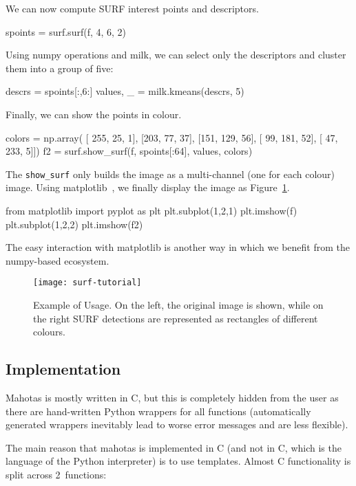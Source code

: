 \documentclass{scrartcl}
\newcommand*{\cpp}{{C\nolinebreak[4]\hspace{-.05em}\raisebox{.4ex}{\tiny\textbf{++}}}}
\begin{document}
We can now compute SURF interest points and descriptors.
\begin{python}
spoints = surf.surf(f, 4, 6, 2)
\end{python}

Using numpy operations and milk, we can select only the descriptors and cluster
them into a group of five:

\begin{python}
descrs = spoints[:,6:]
values, _ = milk.kmeans(descrs, 5)
\end{python}

Finally, we can show the points in colour.
\begin{python}
colors = np.array(
    [ 255,  25,   1],
    [203,  77,  37],
    [151, 129,  56],
    [ 99, 181,  52],
    [ 47, 233,   5]])
f2 = surf.show_surf(f, spoints[:64], values, colors)
\end{python}

The \texttt{show\_surf} only builds the image as a multi-channel (one for each
colour) image. Using matplotlib~\citep{10.1109/MCSE.2007.55}, we finally
display the image as Figure~\ref{fig:surf}.

\begin{python}
from matplotlib import pyplot as plt
plt.subplot(1,2,1)
plt.imshow(f)
plt.subplot(1,2,2)
plt.imshow(f2)
\end{python}

The easy interaction with matplotlib is another way in which we benefit from
the numpy-based ecosystem.

\begin{figure}
\begin{center}
\texttt{[image: surf-tutorial]}
\end{center}
\caption{Example of Usage. On the left, the original image is shown, while on
the right SURF detections are represented as rectangles of different colours.}
\label{fig:surf}
\end{figure}

\subsection{Implementation}

Mahotas is mostly written in \cpp, but this is completely hidden from the user
as there are hand-written Python wrappers for all functions (automatically
generated wrappers inevitably lead to worse error messages and are less
flexible).

The main reason that mahotas is implemented in \cpp{} (and not in C, which is
the language of the Python interpreter) is to use templates. Almost \cpp{}
functionality is split across 2~functions:
\end{document}
